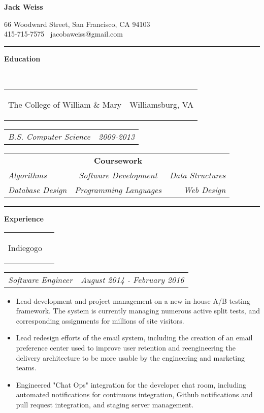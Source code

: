 \documentclass[11pt]{article}
\makeatletter
\newcommand{\headerrow}[2]
{\begin{tabular*}{\linewidth}{l@{\extracolsep{\fill}}r}
	#1 &
	#2 \\
\end{tabular*}}
\makeatother
\begin{document}
\begin{center}
	\begin{huge}
		\bf Jack Weiss
	\end{huge}

	66 Woodward Street, San Francisco, CA 94103 \\
	415-715-7575 \textbullet\ jacobaweiss@gmail.com
\end{center}
\hrule
\vspace{0.5em}

\vspace{0.8em}
\begin{LARGE}
	\bf Education
\end{LARGE}
\vspace{0.5em} \\
\headerrow
	{\begin{Large}The College of William \& Mary\end{Large}}
	{Williamsburg, VA}
\headerrow
	{\textit{B.S. Computer Science}}
	{\textit{2009-2013}}
\vspace{-1.5em}
\begin{center}
	\begin{tabular}{lcr}
		& {\bf Coursework}  & \\
		\textit{Algorithms} & \textit{Software Development} & \textit{Data Structures} \\
		\textit{Database Design} & \textit{Programming Languages} & \textit{Web Design}

	\end{tabular}
\end{center}
\hrule
\vspace{0.5em}

\vspace{0.8em}
\begin{LARGE}
	\bf Experience
\end{LARGE}
\vspace{0.5em}

	\headerrow
		{\begin{Large}Indiegogo\end{Large}}
		{}
	\headerrow
		{\textit{Software Engineer}}
		{\textit{August 2014 - February 2016}}
	\begin{itemize}
		\item Lead development and project management on a new in-house A/B testing framework. The system is currently managing numerous active split tests, and corresponding assignments for millions of site visitors.
		\vspace{-0.8em}
		\item Lead redesign efforts of the email system, including the creation of an email preference center used to improve user retention and reengineering the delivery architecture to be more usable by the engineering and marketing teams.
		\vspace{-0.8em}
		\item Engineered "Chat Ops" integration for the developer chat room, including automated notifications for continuous integration, Github notifications and pull request integration, and staging server management.
	\end{itemize}
\end{document}
